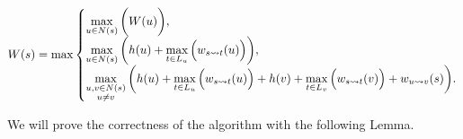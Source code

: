 

$$
W(s) = \max\left\{
   \begin{array}{@{}l@{\thinspace}l}
       \max\limits_{u \in N(s)}\bigg(W(u)\bigg), \\
       \max\limits_{u \in N(s)} \bigg( h(u) + \max\limits_{t \in L_u}\Big(w_{s \rightsquigarrow t}(u)\Big) \bigg), \\
       \max\limits_{\substack{u, v \in N(s) \\ u \ne v}} \bigg( h(u) + \max\limits_{t \in L_u}\Big(w_{s \rightsquigarrow t}(u)\Big) + h(v) + \max\limits_{t \in L_v}\Big(w_{s \rightsquigarrow t}(v)\Big) + w_{u \rightsquigarrow v}(s) \bigg). \\
   \end{array}
\right.
\label{eq:uv_all}
$$

We will prove the correctness of the algorithm with the following Lemma.

